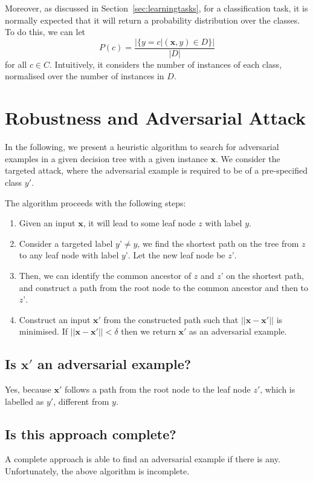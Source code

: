 Moreover, as discussed in Section~\ref{sec:learningtasks}, for a classification task, it is normally expected that it will return a probability distribution over the classes. To do this, we can let 
\begin{equation}
    P(c) = \frac{|\{y=c|(\textbf{x},y)\in D\}|}{|D|} 
\end{equation}
for all $c\in C$. Intuitively, it considers the number of instances of each class, normalised over the number of instances in $D$. 


\section{Robustness and Adversarial Attack}

In the following, we present a heuristic algorithm to search for adversarial examples in a given decision tree with a given instance $\textbf{x}$. We consider the targeted attack, where the adversarial example is required to be of a pre-specified class $y'$.

The algorithm proceeds with the following steps: 

\begin{enumerate}
    \item Given an input $\textbf{x}$, it will lead to some leaf node $z$ with label $y$.
    \item Consider a targeted label $y’\neq y$, we find the shortest path on the tree from $z$ to any leaf node with label $y’$. Let the new leaf node be $z’$.
    \item Then, we can identify the common ancestor of $z$ and $z’$ on the shortest path, and construct a path from the root node to the common ancestor and then to $z’$. 
    \item Construct an input $\textbf{x}'$ from the constructed path such that $||\textbf{x}-\textbf{x}'||$ is minimised. If $||\textbf{x}-\textbf{x}'|| < \delta$ then we return $\textbf{x}'$ as an adversarial example.  
\end{enumerate}

\subsection*{Is $\textbf{x}'$ an adversarial example?}

Yes, because $\textbf{x}'$ follows a path from the root node to the leaf node $z'$, which is labelled as $y'$, different from $y$. 

\subsection*{Is this approach complete?} A complete approach is able to find an adversarial example if there is any. Unfortunately, the above algorithm is incomplete. 

